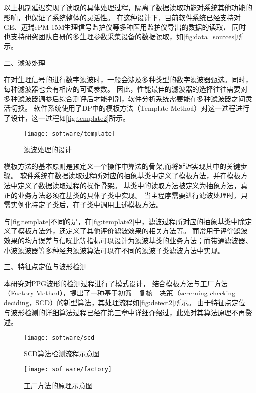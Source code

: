 以上机制延迟实现了读取的具体处理过程，隔离了数据读取功能对系统其他功能的影响，也保证了系统整体的灵活性。
在这种设计下，目前软件系统已经支持对GE、迈瑞ePM 15M生理信号监护仪等多种医用监护仪导出的数据的读取，
同时也支持研究团队自研的多生理参数采集设备的数据读取，如\autoref{fig:data_sources}所示。

二、滤波处理

在对生理信号的进行数字滤波时，一般会涉及多种类型的数字滤波器甄选。同时，每种滤波器也会有相应的可调参数。
因此，性能最佳的滤波器的选择往往需要对多种滤波器调参后综合测评后才能判别，软件分析系统需要能在多种滤波器之间灵活切换。
软件系统使用了DP中的模板方法（Template Method）对这一过程进行了设计\cite{Enrich2018}，这一过程如\autoref{fig:template2}所示。
\begin{figure}[htbp]
    \centering
    \texttt{[image: software/template]}
    \caption{\label{fig:template2}滤波处理的设计}
\end{figure}

模板方法的基本原则是预定义一个操作中算法的骨架,而将延迟实现其中的关键步骤。
软件系统在数据读取过程所对应的抽象基类中定义了模板方法，并在模板方法中定义了数据读取过程的操作骨架。
基类中的读取方法被定义为抽象方法，真正的业务方法必须在基类的具体子类中实现。
当主程序需要进行滤波处理时，只需实例化特定子类后，在子类中调用上述模板方法。

与\autoref{fig:template}不同的是，在\autoref{fig:template2}中，滤波过程所对应的抽象基类中除定义了模板方法外，还定义了其他评价滤波效果的相关方法等。
而常用于评价滤波效果的均方误差与信噪比等指标可以设计为滤波基类的业务方法；而带通滤波器、小波滤波器等多种经典滤波算法可以在不同的滤波子类滤波方法中实现。

三、特征点定位与波形检测

本研究对PPG波形的检测过程进行了模式设计，
结合模板方法与工厂方法（Factory Method）\cite{Enrich2018}，提出了一种基于初筛—复核—决策（screening-checking-deciding，SCD）的新型算法，其处理流程如\autoref{fig:detect2}所示。
由于特征点定位与波形检测的详细算法过程已经在第三章中详细介绍过，此处对其算法原理不再赘述。
\begin{figure}[htbp]
    \centering
    \texttt{[image: software/scd]}
    \caption{\label{fig:detect2}SCD算法检测流程示意图}
\end{figure}
\begin{figure}[htbp]
    \centering
    \texttt{[image: software/factory]}
    \caption{\label{fig:factory}工厂方法的原理示意图}
\end{figure}

